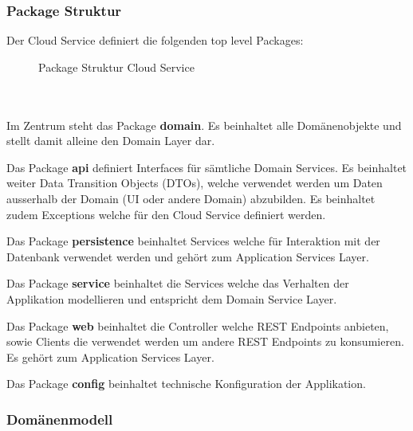 \clearpage

\subsubsection*{Package Struktur}

Der Cloud Service definiert die folgenden top level Packages:

\begin{figure}[h]
    \centering
    \begin{minipage}[b]{0.9\textwidth}

    \caption{Package Struktur Cloud Service}\label{fig:packagescloudservice}
    \end{minipage}
\end{figure}

\\ \\

Im Zentrum steht das Package \textbf{domain}.
Es beinhaltet alle Domänenobjekte und stellt damit alleine den Domain Layer dar.

Das Package \textbf{api} definiert Interfaces für sämtliche Domain Services.
Es beinhaltet weiter Data Transition Objects (DTOs), welche verwendet werden um Daten ausserhalb der Domain (UI oder andere Domain) abzubilden.
Es beinhaltet zudem Exceptions welche für den Cloud Service definiert werden.

Das Package \textbf{persistence} beinhaltet Services welche für Interaktion mit der Datenbank verwendet werden und  gehört zum Application Services Layer.

Das Package \textbf{service} beinhaltet die Services welche das Verhalten der Applikation modellieren und entspricht dem Domain Service Layer.

Das Package \textbf{web} beinhaltet die Controller welche REST Endpoints anbieten, sowie Clients die verwendet werden um andere REST Endpoints zu konsumieren.
Es gehört zum Application Services Layer.

Das Package \textbf{config} beinhaltet technische Konfiguration der Applikation.


\clearpage

\subsubsection{Domänenmodell}

